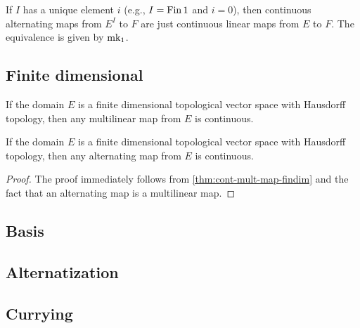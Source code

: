 \begin{definition}%
  \label{def:cont-alt-map-one}
  If \(I\) has a unique element \(i\) (e.g., \(I = \operatorname{Fin} 1\) and \(i = 0\)),
  then continuous alternating maps from \(E^{I}\) to \(F\) are just continuous linear maps from \(E\) to \(F\).
  The equivalence is given by \(\operatorname{mk_1}\).
\end{definition}

\subsection{Finite dimensional}%
\label{sec:finite-dimensional}

\begin{theorem}%
  \label{thm:cont-mult-map-findim}
  If the domain \(E\) is a finite dimensional topological vector space with Hausdorff topology,
  then any multilinear map from \(E\) is continuous.
\end{theorem}

\begin{theorem}%
  \label{thm:cont-alt-map-findim}
  If the domain \(E\) is a finite dimensional topological vector space with Hausdorff topology,
  then any alternating map from \(E\) is continuous.
\end{theorem}
\begin{proof}
  The proof immediately follows from \autoref{thm:cont-mult-map-findim} and the fact that an alternating map is a multilinear map.
\end{proof}
\subsection{Basis}%
\label{sec:basis}


\subsection{Alternatization}%
\label{sec:alternatization}


\subsection{Currying}%
\label{sec:currying}


